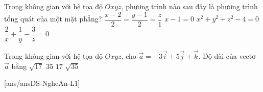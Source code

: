 \begin{ex}%
	Trong không gian với hệ tọa độ $Oxyz$, phương trình nào sau đây là phương trình tổng quát của một mặt phẳng?
	\choice
		{$\dfrac{x-2}{2}=\dfrac{y-1}{2}=\dfrac{z}{1}$}
		{\True $x-1=0$}
		{$x^2+y^2+z^2-4=0$}
		{$\dfrac{2}{x}+\dfrac{1}{y}-\dfrac{3}{z}=0$}
\end{ex}

\begin{ex}%
	Trong không gian với hệ tọa độ $Oxyz$, cho $\vec{a}=-3\vec{i}+5\vec{j}+\vec{k}$. Độ dài của vectơ $\vec{a}$ bằng
	\choice
		{$\sqrt{17}$}
		{$35$}
		{$17$}
		{\True $\sqrt{35}$}
\end{ex}
\cauds
\setcounter{ex}{0}
[ans/ansDS-NgheAn-L1]
